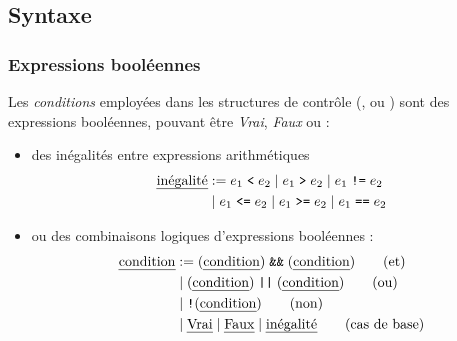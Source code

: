 \documentclass[xcolor=pdftex,svgnames,table]{beamer}
\begin{document}
\subsection{Syntaxe}
\begin{frame}
  \frametitle{Expressions booléennes}
Les \emph{conditions} employées dans les structures de contrôle
(,  ou ) sont des \alert{expressions
booléennes}, pouvant être \emph{Vrai}, \emph{Faux}  ou :\pause
  \begin{itemize}
   \item des inégalités entre expressions arithmétiques
      \begin{align*}
        \text{\emph{inégalité}} &\mathrel{:=} e_1 \mathrel{\texttt{<}} e_2
        \mid e_1 \mathrel{\texttt{>}} e_2 \mid e_1 \mathrel{\texttt{!=}}  e_2 \\
&\mid e_1 \mathrel{\texttt{<=}}  e_2  \mid e_1 \mathrel{\texttt{>=}} e_2  \mid e_1 \mathrel{\texttt{==}} e_2
      \end{align*}
\pause
      \item ou des combinaisons logiques d'expressions booléennes :
        \begin{align*}
          \text{\emph{condition}} &\mathrel{:=}  (\text{\emph{condition}}) \mathrel{\texttt{\&\&}}
          (\text{\emph{condition}}) \tag{et} \\
&\mid (\text{\emph{condition}}) \mathrel{\texttt{||}}
          (\text{\emph{condition}})\tag{ou} \\
&\mid {\texttt{!}}(\text{\emph{condition}}) \tag{non}\\
&\mid \text{\emph{Vrai}} \mid \text{\emph{Faux}} \mid
\text{\emph{inégalité}}\tag{cas de base}
        \end{align*}
  \end{itemize}
\end{frame}
\end{document}
